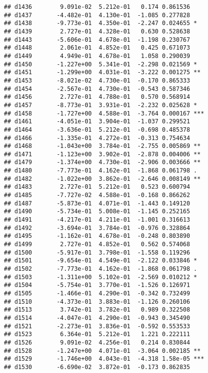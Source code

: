 \documentclass[
]{article}
\begin{document}
\begin{verbatim}
## d1436        9.091e-02  5.212e-01   0.174 0.861536    
## d1437       -4.482e-01  4.130e-01  -1.085 0.277828    
## d1438       -9.773e-01  4.350e-01  -2.247 0.024655 *  
## d1439        2.727e-01  4.328e-01   0.630 0.528638    
## d1443       -5.606e-01  4.678e-01  -1.198 0.230767    
## d1448        2.061e-01  4.852e-01   0.425 0.671073    
## d1449        4.949e-01  4.678e-01   1.058 0.290039    
## d1450       -1.227e+00  5.341e-01  -2.298 0.021569 *  
## d1451       -1.299e+00  4.031e-01  -3.222 0.001275 ** 
## d1453       -8.021e-02  4.730e-01  -0.170 0.865333    
## d1454       -2.567e-01  4.730e-01  -0.543 0.587346    
## d1456        2.727e-01  4.788e-01   0.570 0.568914    
## d1457       -8.773e-01  3.931e-01  -2.232 0.025628 *  
## d1458       -1.727e+00  4.588e-01  -3.764 0.000167 ***
## d1461       -4.051e-01  3.904e-01  -1.037 0.299521    
## d1464       -3.636e-01  5.212e-01  -0.698 0.485378    
## d1466       -1.335e-01  4.272e-01  -0.313 0.754634    
## d1468       -1.043e+00  3.784e-01  -2.755 0.005869 ** 
## d1471       -1.123e+00  3.902e-01  -2.878 0.004006 ** 
## d1479       -1.374e+00  4.730e-01  -2.906 0.003666 ** 
## d1480       -7.773e-01  4.162e-01  -1.868 0.061798 .  
## d1482       -1.022e+00  3.862e-01  -2.646 0.008149 ** 
## d1483        2.727e-01  5.212e-01   0.523 0.600794    
## d1485       -7.727e-02  4.588e-01  -0.168 0.866262    
## d1487       -5.873e-01  4.071e-01  -1.443 0.149120    
## d1490       -5.734e-01  5.008e-01  -1.145 0.252165    
## d1491       -4.217e-01  4.211e-01  -1.001 0.316613    
## d1492       -3.694e-01  3.784e-01  -0.976 0.328864    
## d1495       -1.162e-01  4.678e-01  -0.248 0.803890    
## d1499        2.727e-01  4.852e-01   0.562 0.574068    
## d1500       -5.917e-01  3.798e-01  -1.558 0.119296    
## d1501       -9.654e-01  4.549e-01  -2.122 0.033846 *  
## d1502       -7.773e-01  4.162e-01  -1.868 0.061798 .  
## d1503       -1.311e+00  5.102e-01  -2.569 0.010212 *  
## d1504       -5.754e-01  3.770e-01  -1.526 0.126971    
## d1505       -1.466e-01  4.290e-01  -0.342 0.732499    
## d1510       -4.373e-01  3.883e-01  -1.126 0.260106    
## d1513        3.742e-01  3.782e-01   0.989 0.322508    
## d1514       -4.047e-01  4.290e-01  -0.943 0.345490    
## d1521       -2.273e-01  3.836e-01  -0.592 0.553533    
## d1523        6.364e-01  5.212e-01   1.221 0.222111    
## d1526        9.091e-02  4.256e-01   0.214 0.830844    
## d1528       -1.247e+00  4.071e-01  -3.064 0.002185 ** 
## d1529       -1.746e+00  4.043e-01  -4.318 1.58e-05 ***
## d1530       -6.690e-02  3.872e-01  -0.173 0.862835    

\end{verbatim}
\end{document}
